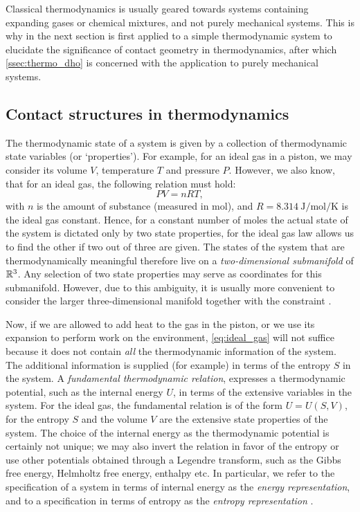 Classical thermodynamics is usually geared towards systems containing expanding gases or chemical mixtures, and not purely mechanical systems. This is why in the next section is first applied to a simple thermodynamic system to elucidate the significance of contact geometry in thermodynamics, after which \cref{ssec:thermo_dho} is concerned with the application to purely mechanical systems.

\subsection{Contact structures in thermodynamics} 
The thermodynamic state of a system is given by a collection of thermodynamic state variables (or `properties'). For example, for an ideal gas in a piston, we may consider its volume $V$, temperature $T$ and pressure $P$. However, we also know, that for an ideal gas, the following relation must hold:
\begin{equation}
    PV = nRT,
    \label{eq:ideal_gas}
\end{equation}
with $n$ is the amount of substance (measured in \si{\mole}), and $R = \SI{8.314}{\joule \per \mole \per \kelvin}$ is the ideal gas constant.  Hence, for a constant number of moles the actual state of the system is dictated only by two state properties, for the ideal gas law allows us to find the other if two out of three are given. The states of the system that are thermodynamically meaningful therefore live on a \emph{two-dimensional submanifold} of $\mathbb{R}^3$. Any selection of two state properties may serve as coordinates for this submanifold. However, due to this ambiguity, it is usually more convenient to consider the larger three-dimensional manifold together with the constraint  \cite{Balian2001, Giancoli2014}.

Now, if we are allowed to add heat to the gas in the piston, or we use its expansion to perform work on the environment, \cref{eq:ideal_gas} will not suffice because it does not contain \emph{all} the thermodynamic information of the system. The additional information is supplied (for example) in terms of the entropy $S$ in the system. A \emph{fundamental thermodynamic relation}, expresses a thermodynamic potential, such as the internal energy $U$, in terms of the extensive variables in the system. For the ideal gas, the fundamental relation is of the form $U = U(S, V)$, for the entropy $S$ and the volume $V$ are the extensive state properties of the system. The choice of the internal energy as the thermodynamic potential is certainly not unique; we may also invert the relation in favor of the entropy or use other potentials obtained through a Legendre transform, such as the Gibbs free energy, Helmholtz free energy, enthalpy etc. In particular, we refer to the specification of a system in terms of internal energy as the \emph{energy representation}, and to a specification in terms of entropy as the \emph{entropy representation} \cite{VanderSchaft2021a}.

